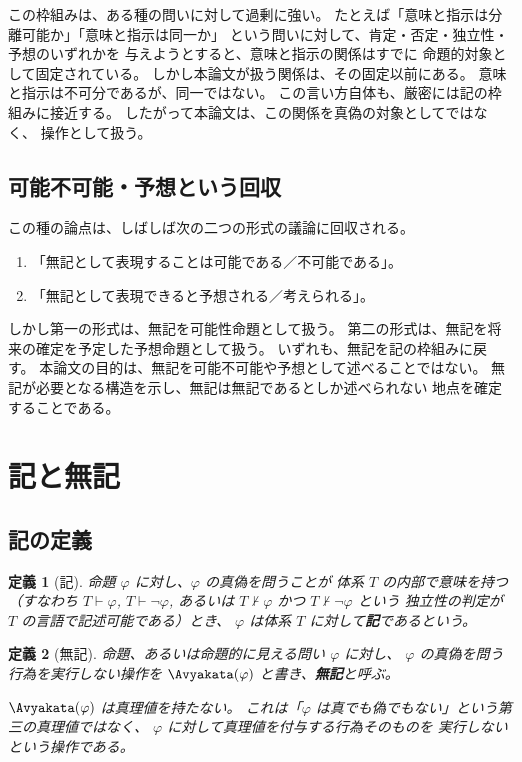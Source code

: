\documentclass[11pt,a4paper,ja=standard,lualatex]{article}
\newtheorem{definition}{定義}
\begin{document}
この枠組みは、ある種の問いに対して過剰に強い。
たとえば「意味と指示は分離可能か」「意味と指示は同一か」
という問いに対して、肯定・否定・独立性・予想のいずれかを
与えようとすると、意味と指示の関係はすでに
命題的対象として固定されている。
しかし本論文が扱う関係は、その固定以前にある。
意味と指示は不可分であるが、同一ではない。
この言い方自体も、厳密には記の枠組みに接近する。
したがって本論文は、この関係を真偽の対象としてではなく、
操作として扱う。

\subsection{可能不可能・予想という回収}

この種の論点は、しばしば次の二つの形式の議論に回収される。

\begin{enumerate}
\item 「無記として表現することは可能である／不可能である」。
\item 「無記として表現できると予想される／考えられる」。
\end{enumerate}

しかし第一の形式は、無記を可能性命題として扱う。
第二の形式は、無記を将来の確定を予定した予想命題として扱う。
いずれも、無記を記の枠組みに戻す。
本論文の目的は、無記を可能不可能や予想として述べることではない。
無記が必要となる構造を示し、無記は無記であるとしか述べられない
地点を確定することである。

\section{記と無記}

\subsection{記の定義}

\begin{definition}[記]
命題 $\varphi$ に対し、$\varphi$ の真偽を問うことが
体系 $T$ の内部で意味を持つ（すなわち $T \vdash \varphi$,
$T \vdash \neg\varphi$, あるいは
$T \nvdash \varphi$ かつ $T \nvdash \neg\varphi$ という
独立性の判定が $T$ の言語で記述可能である）とき、
$\varphi$ は体系 $T$ に対して\textbf{記}であるという。
\end{definition}

\begin{definition}[無記]
命題、あるいは命題的に見える問い $\varphi$ に対し、
$\varphi$ の真偽を問う行為を実行しない操作を
$\Avyakata(\varphi)$ と書き、\textbf{無記}と呼ぶ。

$\Avyakata(\varphi)$ は真理値を持たない。
これは「$\varphi$ は真でも偽でもない」という第三の真理値ではなく、
$\varphi$ に対して真理値を付与する行為そのものを
実行しないという操作である。
\end{definition}
\end{document}
